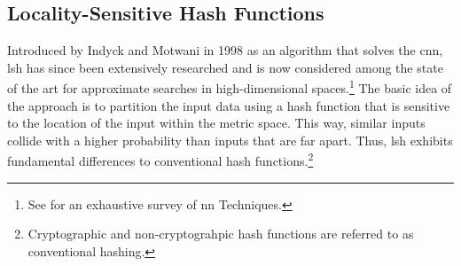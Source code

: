 \documentclass[../../../main.tex]{subfiles}
\begin{document}
\subsection{Locality-Sensitive Hash Functions} \label{subsec:locality-sensitive-hashes}

Introduced by Indyck and Motwani in 1998 \cite{indyk_approximate_1998} as an algorithm that solves the \gls{cnn}, \gls{lsh} has since been extensively researched and is now considered among the state of the art for approximate searches in high-dimensional spaces.\footnote{See \cite{nagarkar2021exploring} for an exhaustive survey of \gls{nn} Techniques.} The basic idea of the approach is to partition the input data using a hash function that is sensitive to the location of the input within the metric space. This way, similar inputs collide with a higher probability than inputs that are far apart. Thus, \gls{lsh} exhibits fundamental differences to conventional hash functions.\footnote{Cryptographic and non-cryptograhpic hash functions are referred to as conventional hashing.}
\end{document}
